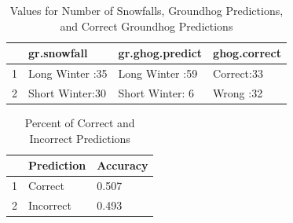 \documentclass[12pt]{article}\usepackage[]{graphicx}\usepackage[]{color}
\begin{document}
\newpage
\begin{table}[ht]
\centering
\begin{tabular}{rlll}
  \hline
 &       gr.snowfall &     gr.ghog.predict &  ghog.correct \\ 
  \hline
1 & Long Winter :35   & Long Winter :59   & Correct:33   \\ 
  2 & Short Winter:30   & Short Winter: 6   & Wrong  :32   \\ 
   \hline
\end{tabular}
\caption{Values for Number of Snowfalls, Groundhog Predictions, and Correct Groundhog Predictions} 
\end{table}
\begin{table}[ht]
\centering
\begin{tabular}{rll}
  \hline
 & Prediction & Accuracy \\ 
  \hline
1 & Correct & 0.507 \\ 
  2 & Incorrect & 0.493 \\ 
   \hline
\end{tabular}
\caption{Percent of Correct and Incorrect Predictions} 
\end{table}



 
 
 
\end{document}
